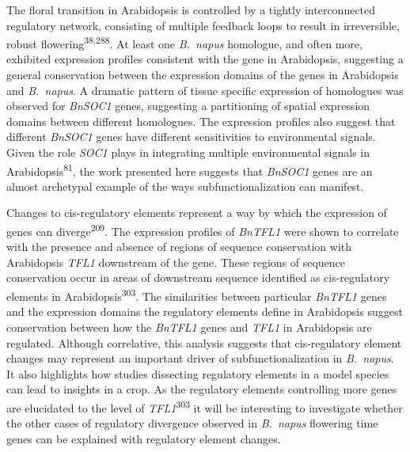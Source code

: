 \documentclass[12pt,]{book}
\begin{document}
The floral transition in Arabidopsis is controlled by a tightly
interconnected regulatory network, consisting of multiple feedback loops
to result in irreversible, robust flowering\textsuperscript{38,288}. At
least one \emph{B.~napus} homologue, and often more, exhibited
expression profiles consistent with the gene in Arabidopsis, suggesting
a general conservation between the expression domains of the genes in
Arabidopsis and \emph{B.~napus}. A dramatic pattern of tissue specific
expression of homologues was observed for \emph{BnSOC1} genes,
suggesting a partitioning of spatial expression domains between
different homologues. The expression profiles also suggest that
different \emph{BnSOC1} genes have different sensitivities to
environmental signals. Given the role \emph{SOC1} plays in integrating
multiple environmental signals in Arabidopsis\textsuperscript{81}, the
work presented here suggests that \emph{BnSOC1} genes are an almost
archetypal example of the ways subfunctionalization can manifest.

Changes to cis-regulatory elements represent a way by which the
expression of genes can diverge\textsuperscript{209}. The expression
profiles of \emph{BnTFL1} were shown to correlate with the presence and
absence of regions of sequence conservation with Arabidopsis \emph{TFL1}
downstream of the gene. These regions of sequence conservation occur in
areas of downstream sequence identified as cis-regulatory elements in
Arabidopsis\textsuperscript{303}. The similarities between particular
\emph{BnTFL1} genes and the expression domains the regulatory elements
define in Arabidopsis suggest conservation between how the \emph{BnTFL1}
genes and \emph{TFL1} in Arabidopsis are regulated. Although
correlative, this analysis suggests that cis-regulatory element changes
may represent an important driver of subfunctionalization in
\emph{B.~napus}. It also highlights how studies dissecting regulatory
elements in a model species can lead to insights in a crop. As the
regulatory elements controlling more genes are elucidated to the level
of \emph{TFL1}\textsuperscript{303} it will be interesting to
investigate whether the other cases of regulatory divergence observed in
\emph{B.~napus} flowering time genes can be explained with regulatory
element changes.
\end{document}
